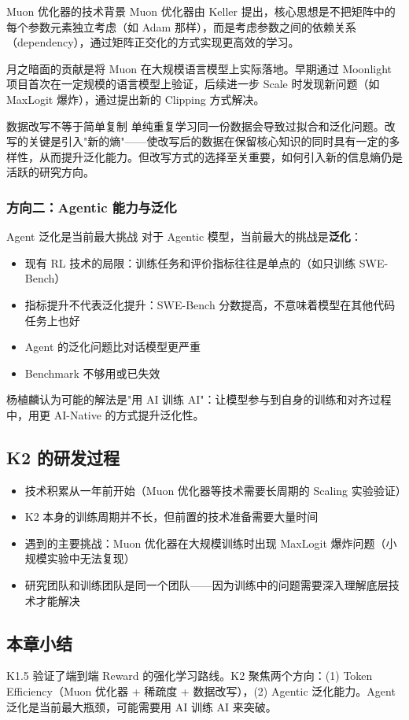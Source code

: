 \begin{knowledgebox}{Muon 优化器的技术背景}
Muon 优化器由 Keller 提出，核心思想是不把矩阵中的每个参数元素独立考虑（如 Adam 那样），而是考虑参数之间的依赖关系（dependency），通过矩阵正交化的方式实现更高效的学习。

月之暗面的贡献是将 Muon 在大规模语言模型上实际落地。早期通过 Moonlight 项目首次在一定规模的语言模型上验证，后续进一步 Scale 时发现新问题（如 MaxLogit 爆炸），通过提出新的 Clipping 方式解决。
\end{knowledgebox}

\begin{warningbox}{数据改写不等于简单复制}
单纯重复学习同一份数据会导致过拟合和泛化问题。改写的关键是引入"新的熵"——使改写后的数据在保留核心知识的同时具有一定的多样性，从而提升泛化能力。但改写方式的选择至关重要，如何引入新的信息熵仍是活跃的研究方向。
\end{warningbox}

\subsubsection{方向二：Agentic 能力与泛化}

\begin{importantbox}{Agent 泛化是当前最大挑战}
对于 Agentic 模型，当前最大的挑战是\textbf{泛化}：
\begin{itemize}
    \item 现有 RL 技术的局限：训练任务和评价指标往往是单点的（如只训练 SWE-Bench）
    \item 指标提升不代表泛化提升：SWE-Bench 分数提高，不意味着模型在其他代码任务上也好
    \item Agent 的泛化问题比对话模型更严重
    \item Benchmark 不够用或已失效
\end{itemize}
\end{importantbox}

杨植麟认为可能的解法是"用 AI 训练 AI"：让模型参与到自身的训练和对齐过程中，用更 AI-Native 的方式提升泛化性。

\subsection{K2 的研发过程}

\begin{itemize}
    \item 技术积累从一年前开始（Muon 优化器等技术需要长周期的 Scaling 实验验证）
    \item K2 本身的训练周期并不长，但前置的技术准备需要大量时间
    \item 遇到的主要挑战：Muon 优化器在大规模训练时出现 MaxLogit 爆炸问题（小规模实验中无法复现）
    \item 研究团队和训练团队是同一个团队——因为训练中的问题需要深入理解底层技术才能解决
\end{itemize}

\subsection{本章小结}

K1.5 验证了端到端 Reward 的强化学习路线。K2 聚焦两个方向：(1) Token Efficiency（Muon 优化器 + 稀疏度 + 数据改写），(2) Agentic 泛化能力。Agent 泛化是当前最大瓶颈，可能需要用 AI 训练 AI 来突破。


